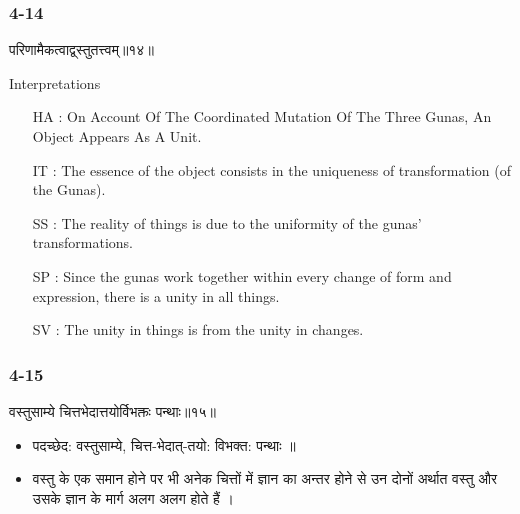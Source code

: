 \begin{frame}[fragile]\frametitle{4-14}
\begin{sanskrit}
परिणामैकत्वाद्व्स्तुतत्त्वम्॥१४॥ 
\end{sanskrit}

Interpretations
\begin{itemize}	
\item [HA]: On Account Of The Coordinated Mutation Of The Three Gunas, An Object Appears As A Unit.
\item [IT]: The essence of the object consists in the uniqueness of transformation (of the Gunas).
\item [SS]: The reality of things is due to the uniformity of the gunas’ transformations.
\item [SP]: Since the gunas work together within every change of form and expression, there is a unity in all things.
\item [SV]: The unity in things is from the unity in changes. 
\end{itemize}
\end{frame}

\begin{frame}[fragile]\frametitle{4-15}
\begin{sanskrit}
वस्तुसाम्ये चित्तभेदात्तयोर्विभक्तः पन्थाः॥१५॥
\end{sanskrit}

\begin{itemize}
\item पदच्छेद:  वस्तुसाम्ये‌, चित्त-भेदात्-तयो: विभक्त: ‌पन्थाः ॥
\item वस्तु के एक समान होने पर भी अनेक चित्तों में ज्ञान का अन्तर होने से उन दोनों अर्थात वस्तु और उसके ज्ञान के मार्ग अलग अलग होते हैं ।
\end{itemize}
\end{frame}


